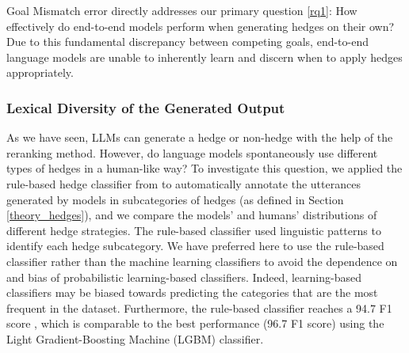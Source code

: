 \documentclass[11pt]{article}
\begin{document}

Goal Mismatch error directly addresses our primary question \ref{rq1}: How effectively do end-to-end models perform when generating hedges on their own? Due to this fundamental discrepancy between competing goals, end-to-end language models are unable to inherently learn and discern when to apply hedges appropriately. 

\subsubsection{Lexical Diversity of the Generated Output}

As we have seen, LLMs can generate a hedge or non-hedge with the help of the reranking method. However, do language models spontaneously use different types of hedges in a human-like way? To investigate this question, we applied the rule-based hedge classifier from \citep{raphalen-etal-2022-might} to automatically annotate the utterances generated by models in subcategories of hedges (as defined in Section \ref{theory_hedges}), and we compare the models' and humans' distributions of different hedge strategies. The rule-based classifier used linguistic patterns to identify each hedge subcategory. We have preferred here to use the rule-based classifier rather than the machine learning classifiers  to avoid the dependence on and bias of probabilistic learning-based classifiers. Indeed, learning-based classifiers may be biased towards predicting the categories that are the most frequent in the dataset. Furthermore, the rule-based classifier reaches a 94.7 F1 score \citep{raphalen-etal-2022-might}, which is comparable to the best performance (96.7 F1 score) using the Light Gradient-Boosting Machine (LGBM) \citep{ke2017lightgbm} classifier. 

\end{document}
